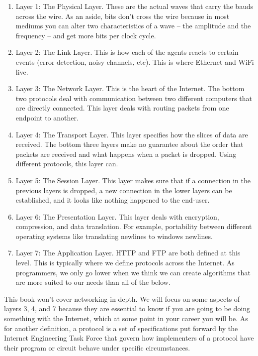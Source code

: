 \begin{enumerate}
\item Layer 1: The Physical Layer.
  These are the actual waves that carry the bauds across the wire.
  As an aside, bits don't cross the wire because in most mediums you can alter two characteristics of a wave -- the amplitude and the frequency -- and get more bits per clock cycle.

\item Layer 2: The Link Layer.
  This is how each of the agents reacts to certain events (error detection, noisy channels, etc).
  This is where \gls{Ethernet} and \gls{WiFi} live.

\item Layer 3: The Network Layer.
  This is the heart of the Internet.
  The bottom two protocols deal with communication between two different computers that are directly connected.
  This layer deals with routing packets from one endpoint to another.

\item Layer 4: The Transport Layer.
  This layer specifies how the slices of data are received.
  The bottom three layers make no guarantee about the order that packets are received and what happens when a packet is dropped.
  Using different protocols, this layer can.

\item Layer 5: The Session Layer.
  This layer makes sure that if a connection in the previous layers is dropped, a new connection in the lower layers can be established, and it looks like nothing happened to the end-user.

\item Layer 6: The Presentation Layer.
  This layer deals with encryption, compression, and data translation.
  For example, portability between different operating systems like translating newlines to windows newlines.

\item Layer 7: The Application Layer.
  \gls{HTTP} and \gls{FTP} are both defined at this level.
  This is typically where we define protocols across the Internet.
  As programmers, we only go lower when we think we can create algorithms that are more suited to our needs than all of the below.

\end{enumerate}

This book won't cover networking in depth.
We will focus on some aspects of layers 3, 4, and 7 because they are essential to know if you are going to be doing something with the Internet, which at some point in your career you will be.
As for another definition, a protocol is a set of specifications put forward by the \gls{Internet Engineering Task Force} that govern how implementers of a protocol have their program or circuit behave under specific circumstances.

